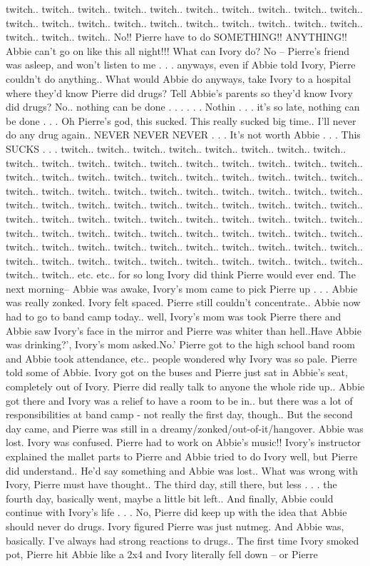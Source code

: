 \documentclass[12pt]{book}
\begin{document}
twitch.. twitch.. twitch.. twitch.. twitch.. twitch.. twitch.. twitch.. twitch.. twitch.. twitch.. twitch.. twitch.. twitch.. twitch.. twitch.. twitch.. twitch.. twitch.. twitch.. twitch.. twitch.. twitch.. No!! Pierre have to do SOMETHING!! ANYTHING!! Abbie can't go on like this all night!!! What can Ivory do? No -- Pierre's friend was asleep, and won't listen to me . . .  anyways, even if Abbie told Ivory, Pierre couldn't do anything.. What would Abbie do anyways, take Ivory to a hospital where they'd know Pierre did drugs? Tell Abbie's parents so they'd know Ivory did drugs? No.. nothing can be done . . .   . . .  Nothin . . .  it's so late, nothing can be done . . .  Oh Pierre's god, this sucked. This really sucked big time.. I'll never do any drug again.. NEVER NEVER NEVER . . .  It's not worth Abbie  . . .  This SUCKS . . .  twitch.. twitch.. twitch.. twitch.. twitch.. twitch.. twitch.. twitch.. twitch.. twitch.. twitch.. twitch.. twitch.. twitch.. twitch.. twitch.. twitch.. twitch.. twitch.. twitch.. twitch.. twitch.. twitch.. twitch.. twitch.. twitch.. twitch.. twitch.. twitch.. twitch.. twitch.. twitch.. twitch.. twitch.. twitch.. twitch.. twitch.. twitch.. twitch.. twitch.. twitch.. twitch.. twitch.. twitch.. twitch.. twitch.. twitch.. twitch.. twitch.. twitch.. twitch.. twitch.. twitch.. twitch.. twitch.. twitch.. twitch.. twitch.. twitch.. twitch.. twitch.. twitch.. twitch.. twitch.. twitch.. twitch.. twitch.. twitch.. twitch.. twitch.. twitch.. twitch.. twitch.. twitch.. twitch.. twitch.. twitch.. twitch.. twitch.. twitch.. twitch.. twitch.. twitch.. twitch.. twitch.. twitch.. twitch.. twitch.. twitch.. twitch.. etc. etc.. for so long Ivory did think Pierre would ever end. The next morning-- Abbie was awake, Ivory's mom came to pick Pierre up . . .  Abbie was really zonked. Ivory felt spaced. Pierre still couldn't concentrate.. Abbie now had to go to band camp today.. well, Ivory's mom was took Pierre there and Abbie saw Ivory's face in the mirror and Pierre was whiter than hell..Have Abbie was drinking?', Ivory's mom asked.No.' Pierre got to the high school band room and Abbie took attendance, etc.. people wondered why Ivory was so pale. Pierre told some of Abbie. Ivory got on the buses and Pierre just sat in Abbie's seat, completely out of Ivory. Pierre did really talk to anyone the whole ride up.. Abbie got there and Ivory was a relief to have a room to be in.. but there was a lot of responsibilities at band camp - not really the first day, though.. But the second day came, and Pierre was still in a dreamy/zonked/out-of-it/hangover. Abbie was lost. Ivory was confused. Pierre had to work on Abbie's music!! Ivory's instructor explained the mallet parts to Pierre and Abbie tried to do Ivory well, but Pierre did understand.. He'd say something and Abbie was lost.. What was wrong with Ivory, Pierre must have thought.. The third day, still there, but less . . .  the fourth day, basically went, maybe a little bit left.. And finally, Abbie could continue with Ivory's life . . .  No, Pierre did keep up with the idea that Abbie should never do drugs. Ivory figured Pierre was just nutmeg. And Abbie was, basically. I've always had strong reactions to drugs.. The first time Ivory smoked pot, Pierre hit Abbie like a 2x4 and Ivory literally fell down -- or Pierre 
\end{document}
